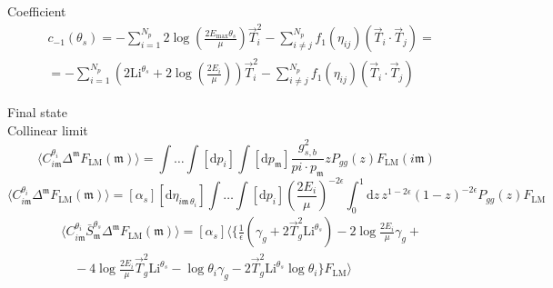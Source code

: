 \documentclass[a4paper, 12pt]{book}
\newcommand{\um}{\mathfrak{m}}
\begin{document}
Coefficient
\begin{equation}
  \begin{split}
  & c_{-1}(\theta_s) = -\sum_{i=1}^{N_p} 2 \log{\left(\frac{2 E_{\mathrm{max}}\theta_s}{\mu} \right)} \vec{T}_i^2 - \sum_{i\neq j}^{N_p} f_1(\eta_{ij}) (\vec{T}_i \cdot \vec{T}_j) = \\
  & = -\sum_{i=1}^{N_p} \left( 2 \mathrm{Li}^{\theta_s} + 2 \log{\left(\frac{2 E_i}{\mu} \right) } \right) \vec{T}_i^2 - \sum_{i\neq j}^{N_p} f_1(\eta_{ij}) (\vec{T}_i \cdot \vec{T}_j)
  \end{split}
\end{equation}

Final state \\
Collinear limit
\begin{equation}
  \langle C_{i\um}^{\theta_i} \Delta^\um F_{\mathrm{LM}} (\um) \rangle = \int \dots \int [\mathrm{d}p_i] \int [\mathrm{d}p_\um] \frac{g^2_{s,b}}{pi \cdot p_\um} z P_{gg}(z) F_{\mathrm{LM}}(i \um)
\end{equation}
\begin{equation}
  \langle C_{i\um}^{\theta_i} \Delta^\um F_{\mathrm{LM}} (\um) \rangle = [\alpha_s] [\mathrm{d}\eta_{i\um \, \theta_i}] \int \dots \int [\mathrm{d}p_i] \left( \frac{2 E_i}{\mu}\right)^{-2 \epsilon} \int_0^1 \mathrm{d}z \, z^{1-2\epsilon} (1-z)^{-2\epsilon} P_{gg}(z) F_{\mathrm{LM}}
\end{equation}
\begin{equation}
  \begin{split}
  &\langle C_{i\mathfrak{m}}^{\theta_i} \bar{S}_{\mathfrak{m}}^{\theta_s} \Delta^{\mathfrak{m}} F_{\mathrm{LM}}(\mathfrak{m})\rangle = [\alpha_s] \langle \bigg\{ \frac{1}{\epsilon}(\gamma_g + 2 \vec{T}_g^2 \mathrm{Li}^{\theta_s}) - 2 \log{\frac{2 E_i}{\mu}}\gamma_g + \\ 
  & \quad - 4 \log{\frac{2 E_i}{\mu}}\vec{T}_g^2 \mathrm{Li}^{\theta_s} - \log{\theta_i} \gamma_g - 2 \vec{T}_g^2 \mathrm{Li}^{\theta_s} \log{\theta_i} \bigg\} F_{\mathrm{LM}} \rangle
  \end{split}
\end{equation}

\clearpage
\end{document}
